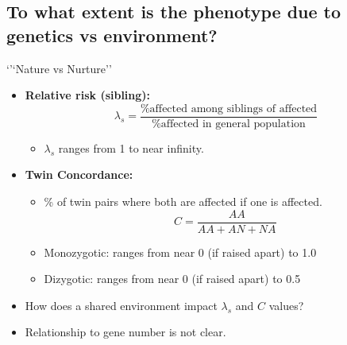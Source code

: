 \documentclass[10pt]{article}
\begin{document}
\subsection*{To what extent is the phenotype due to genetics vs environment?}
`'`Nature vs Nurture''
\begin{itemize}
	\item \textbf{Relative risk (sibling):} 
	\[\lambda_s = \frac{\text{\% affected among siblings of affected}}{\text{\% affected in general population}}\]
    \begin{itemize}
	    \item $\lambda_s$ ranges from 1 to near infinity.
    \end{itemize}
    \item \textbf{Twin Concordance:}
    \begin{itemize}
	    \item \% of twin pairs where both are affected if one is affected.
	    \[C = \frac{AA}{AA + AN + NA}\]
        \item Monozygotic: ranges from near 0 (if raised apart) to 1.0
        \item Dizygotic: ranges from near 0 (if raised apart) to 0.5
    \end{itemize}
    \item How does a shared environment impact $\lambda_s$ and $C$ values?
    \item Relationship to gene number is not clear.
\end{itemize}
\end{document}
